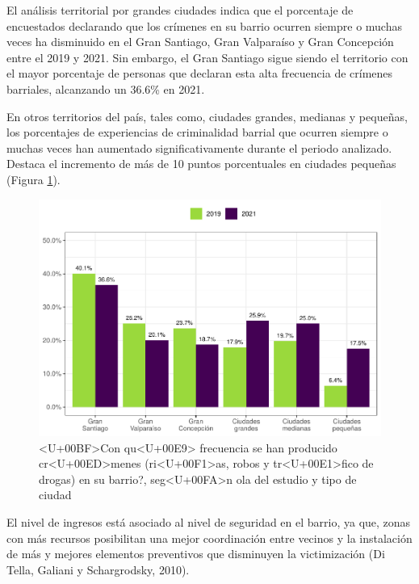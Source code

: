 \documentclass[
  12pt,
]{book}
\begin{document}
El análisis territorial por grandes ciudades indica que el porcentaje de encuestados declarando que los crímenes en su barrio ocurren siempre o muchas veces ha disminuido en el Gran Santiago, Gran Valparaíso y Gran Concepción entre el 2019 y 2021. Sin embargo, el Gran Santiago sigue siendo el territorio con el mayor porcentaje de personas que declaran esta alta frecuencia de crímenes barriales, alcanzando un 36.6\% en 2021.

En otros territorios del país, tales como, ciudades grandes, medianas y pequeñas, los porcentajes de experiencias de criminalidad barrial que ocurren siempre o muchas veces han aumentado significativamente durante el periodo analizado. Destaca el incremento de más de 10 puntos porcentuales en ciudades pequeñas (Figura \ref{fig:crim-estrato}).

\begin{figure}

{\centering \includegraphics{reporte-elsoc_files/figure-latex/crim-estrato-1} 

}

\caption{<U+00BF>Con qu<U+00E9> frecuencia se han producido cr<U+00ED>menes (ri<U+00F1>as, robos y tr<U+00E1>fico de drogas) en su barrio?, seg<U+00FA>n ola del estudio y tipo de ciudad}\label{fig:crim-estrato}
\end{figure}

El nivel de ingresos está asociado al nivel de seguridad en el barrio, ya que, zonas con más recursos posibilitan una mejor coordinación entre vecinos y la instalación de más y mejores elementos preventivos que disminuyen la victimización (Di Tella, Galiani y Schargrodsky, 2010).
\end{document}

